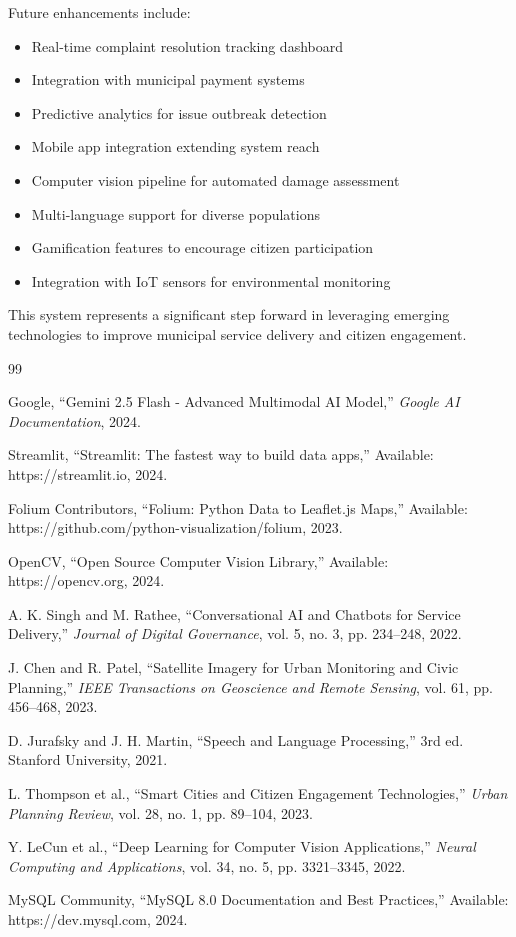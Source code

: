 \documentclass[11pt,a4paper]{article}
\begin{document}
Future enhancements include:

\begin{itemize}
    \item Real-time complaint resolution tracking dashboard
    \item Integration with municipal payment systems
    \item Predictive analytics for issue outbreak detection
    \item Mobile app integration extending system reach
    \item Computer vision pipeline for automated damage assessment
    \item Multi-language support for diverse populations
    \item Gamification features to encourage citizen participation
    \item Integration with IoT sensors for environmental monitoring
\end{itemize}

This system represents a significant step forward in leveraging emerging technologies to improve municipal service delivery and citizen engagement.

\begin{thebibliography}{99}

 Google, ``Gemini 2.5 Flash - Advanced Multimodal AI Model,'' \textit{Google AI Documentation}, 2024.

 Streamlit, ``Streamlit: The fastest way to build data apps,'' Available: https://streamlit.io, 2024.

 Folium Contributors, ``Folium: Python Data to Leaflet.js Maps,'' Available: https://github.com/python-visualization/folium, 2023.

 OpenCV, ``Open Source Computer Vision Library,'' Available: https://opencv.org, 2024.

 A. K. Singh and M. Rathee, ``Conversational AI and Chatbots for Service Delivery,'' \textit{Journal of Digital Governance}, vol. 5, no. 3, pp. 234--248, 2022.

 J. Chen and R. Patel, ``Satellite Imagery for Urban Monitoring and Civic Planning,'' \textit{IEEE Transactions on Geoscience and Remote Sensing}, vol. 61, pp. 456--468, 2023.

 D. Jurafsky and J. H. Martin, ``Speech and Language Processing,'' 3rd ed. Stanford University, 2021.

 L. Thompson et al., ``Smart Cities and Citizen Engagement Technologies,'' \textit{Urban Planning Review}, vol. 28, no. 1, pp. 89--104, 2023.

 Y. LeCun et al., ``Deep Learning for Computer Vision Applications,'' \textit{Neural Computing and Applications}, vol. 34, no. 5, pp. 3321--3345, 2022.

 MySQL Community, ``MySQL 8.0 Documentation and Best Practices,'' Available: https://dev.mysql.com, 2024.

\end{thebibliography}
\end{document}

